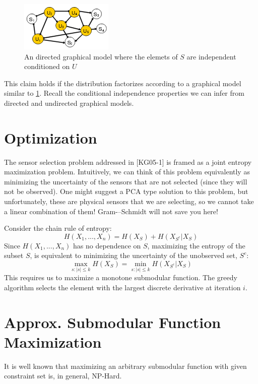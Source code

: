 \documentclass[twoside]{article}
\renewcommand{\cite}[1]{[#1]}
\theoremstyle{definition}
\begin{document}
\begin{figure}[h]
  \centering
  \includegraphics[scale=0.8]{cond_ind.png}
  \caption{An directed graphical model where the elemets of $S$ are
    independent conditioned on $U$}
  \label{fig:ugm}
\end{figure}

This claim holds if the distribution factorizes according to a
graphical model similar to \ref{fig:ugm}. Recall the conditional
independence properties we can infer from directed and undirected graphical
models.

\section{Optimization}
The sensor selection problem addressed in \cite{KG05-1} is framed as
a joint entropy maximization problem. Intuitively, we can think of this
problem equivalently as minimizing the uncertainty of the sensors that
are not selected (since they will not be observed). One might suggest
a PCA type solution to this problem, but unfortunately, these are
physical sensors that we are selecting, so we cannot take a linear
combination of them! Gram-–Schmidt will not save you here!

Consider the chain rule of entropy:
$$H(X_1, ..., X_n) = H(X_S) + H(X_{S^c} | X_S)$$
Since $H(X_1, ..., X_n)$ has no dependence on $S$, maximizing the
entropy of the subset $S$, is equivalent to minimizing the
uncertainty of the unobserved set, $S^c$:
$$\max_{s: |s| \leq k} H(X_S) = \min_{s: |s| \leq k} H(X_{S^c} |
X_S)$$
This requires us to maximize a monotone submodular function. The
greedy algorithm selects the element with the largest discrete
derivative at iteration $i$.


\newpage
\section{Approx. Submodular Function Maximization}


It is well known that maximizing an arbitrary submodular function with
given constraint set is, in general, NP-Hard. %
\end{document}

